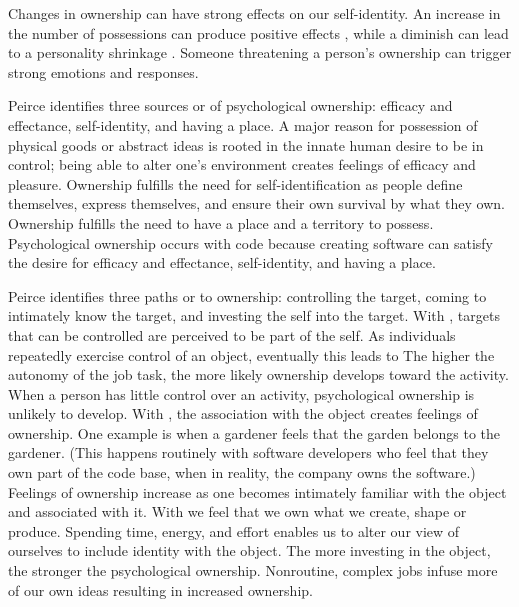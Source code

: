 Changes in ownership can have strong effects on our self-identity. An increase in the number of possessions can produce positive effects \cite{Formanek1994}, while a diminish can lead to a personality shrinkage \cite{James1890}. Someone threatening a person's ownership can trigger strong emotions and responses.

Peirce \cite{Pierce2001} identifies three sources or  of psychological ownership: efficacy and effectance, self-identity, and having a place. A major reason for possession of physical goods or abstract ideas is rooted in the innate human desire to be in control; being able to alter one's environment creates feelings of efficacy and pleasure. Ownership fulfills the need for self-identification as people define themselves, express themselves, and ensure their own survival by what they own. Ownership fulfills the need to have a place and a territory to possess.  Psychological ownership occurs with code because creating software can satisfy the desire for efficacy and effectance, self-identity, and having a place.

Peirce identifies three paths or  to ownership: controlling the target, coming to intimately know the target, and investing the self into the target. With , targets that can be controlled are perceived to be part of the self.  As  individuals repeatedly exercise control of an object, eventually this leads to  The higher the autonomy of the job task, the more likely ownership develops toward the activity. When a person has little control over an activity, psychological ownership is unlikely to develop. With , the association with the object creates feelings of ownership. One example is when a gardener feels that the garden belongs to the gardener. (This happens routinely with software developers who feel that they own part of the code base, when in reality, the company owns the software.) Feelings of ownership increase as one becomes intimately familiar with the object and associated with it. With  we feel that we own what we create, shape or produce. Spending time, energy, and effort enables us to alter our view of ourselves to include identity with the object. The more investing in the object, the stronger the psychological ownership. Nonroutine, complex jobs infuse more of our own ideas resulting in increased ownership.


